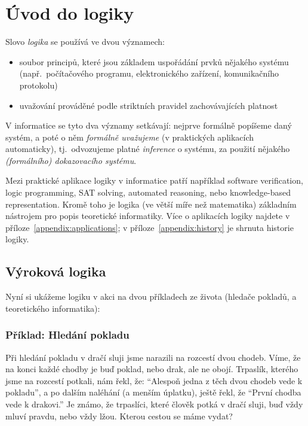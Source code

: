 \chapter{Úvod do logiky}


Slovo \emph{logika} se používá ve dvou významech:
\begin{itemize}
    \item soubor principů, které jsou základem uspořádání prvků nějakého systému (např.\ počítačového programu, elektronického zařízení, komunikačního protokolu)
    \item uvažování prováděné podle striktních pravidel zachovávajících platnost
\end{itemize}
V informatice se tyto dva významy setkávají: nejprve formálně popíšeme daný systém, a poté o něm \emph{formálně uvažujeme} (v praktických aplikacích automaticky), tj.\ odvozujeme platné \emph{inference} o systému, za použití nějakého \emph{(formálního) dokazovacího systému}.

Mezi praktické aplikace logiky v informatice patří například software verification, logic programming, SAT solving, automated reasoning, nebo knowledge-based representation. Kromě toho je logika (ve větší míře než matematika) základním nástrojem pro popis teoretické informatiky. Více o aplikacích logiky najdete v příloze~\ref{appendix:applications}; v příloze~\ref{appendix:history} je shrnuta historie logiky.



\section{Výroková logika}

Nyní si ukážeme logiku v akci na dvou příkladech ze života (hledače pokladů, a teoretického informatika):


\subsection{Příklad: Hledání pokladu}

\begin{tcolorbox}
\begin{example}
Při hledání pokladu v dračí sluji jsme narazili na rozcestí dvou chodeb. Víme, že na konci každé chodby je buď poklad, nebo drak, ale ne obojí. Trpaslík, kterého jsme na rozcestí potkali, nám řekl, že: ``Alespoň jedna z těch dvou chodeb vede k pokladu'', a po dalším naléhání (a menším úplatku), ještě řekl, že ``První chodba vede k drakovi.'' Je známo, že trpaslíci, které člověk potká v dračí sluji, buď vždy mluví pravdu, nebo vždy lžou. Kterou cestou se máme vydat?
\end{example}
\end{tcolorbox}

